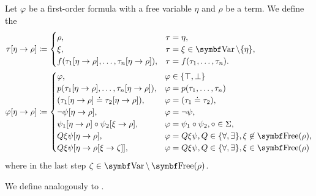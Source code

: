 \begin{definition}\label{def:first_order_substition}
  Let \( \varphi \) be a first-order formula with a free variable \( \eta \) and \( \rho \) be a term. We define the 
  \begin{align*}
    \tau[\eta \to \rho] &\coloneqq \begin{cases}
      \rho,                                                    &\tau = \eta, \\
      \xi,                                                     &\tau = \xi \in \Bold{Var} \setminus \{ \eta \}, \\
      f(\tau_1[\eta \to \rho], \ldots, \tau_n[\eta \to \rho]), &\tau = f(\tau_1, \ldots, \tau_n).
    \end{cases}
    \\
    \varphi[\eta \to \rho] &\coloneqq \begin{cases}
      \varphi,                                                 &\varphi \in \{ \top, \bot \} \\
      p(\tau_1[\eta \to \rho], \ldots, \tau_n[\eta \to \rho]), &\varphi = p(\tau_1, \ldots, \tau_n) \\
      (\tau_1[\eta \to \rho] \doteq \tau_2[\eta \to \rho]),    &\varphi = (\tau_1 \doteq \tau_2), \\
      \neg \psi[\eta \to \rho],                                &\varphi = \neg \psi, \\
      \psi_1[\eta \to \rho] \circ \psi_2[\xi \to \rho],          &\varphi = \psi_1 \circ \psi_2, \circ \in \Sigma, \\
      Q \xi \psi[\eta \to \rho],                               &\varphi = Q \xi \psi, Q \in \{ \forall, \exists \}, \xi \not\in \Bold{Free}(\rho), \\
      Q \xi \psi[\eta \to \rho[\xi \to \zeta]],                &\varphi = Q \xi \psi, Q \in \{ \forall, \exists \}, \xi \in \Bold{Free}(\rho)
    \end{cases}
  \end{align*}
  where in the last step \( \zeta \in \Bold{Var} \setminus \Bold{Free}(\rho) \).

  We define  analogously to .
\end{definition}

